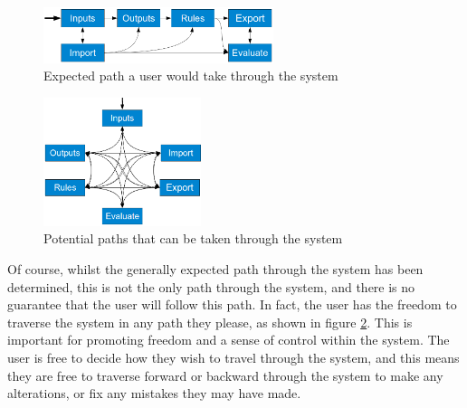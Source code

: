 \begin{figure}[ht!]
\begin{center}
\includegraphics[width=0.6\textwidth]{images/genericPathOne}
\end{center}
\caption{Expected path a user would take through the system}
\label{fig:pathThrough}
\end{figure}
\noindent 
\begin{figure}
\hspace{5mm}
\vspace{-5mm}
	\begin{center}
    \includegraphics[width=0.41\textwidth]{images/web}
	\end{center}
	\vspace{-7mm}
  \caption{Potential paths that can be taken through the system}
  \vspace{-3mm}
  \label{fig:webThrough}
    \vspace{-13mm}
\end{figure}
\noindent
Of course, whilst the generally expected path through the system has been determined, this is not the only path through the system, and there is no guarantee that the user will follow this path. In fact, the user has the freedom to traverse the system in any path they please, as shown in figure \ref{fig:webThrough}. This is important for promoting freedom and a sense of control within the system. The user is free to decide how they wish to travel through the system, and this means they are free to traverse forward or backward through the system to make any alterations, or fix any mistakes they may have made.




\newpage 
